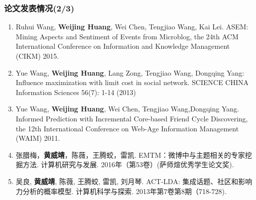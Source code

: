 \begin{transparentFootline}
\begin{frame}
\frametitle{\noindent 论文发表情况(2/3)}

\footnotesize
\begin{enumerate}\addtocounter{enumi}{5}
\item Ruhui Wang, \textbf{Weijing Huang}, Wei Chen, Tengjiao Wang, Kai Lei. ASEM: Mining Aspects and Sentiment of Events from Microblog, the 24th ACM International Conference on Information and Knowledge Management (CIKM) 2015.
\item Yue Wang, \textbf{Weijing Huang}, Lang Zong, Tengjiao Wang, Dongqing Yang: Influence maximization with limit cost in social network. SCIENCE CHINA Information Sciences 56(7): 1-14 (2013) 
\item Yue Wang, \textbf{Weijing Huang}, Wei Chen, Tengjiao Wang,Dongqing Yang. Informed Prediction with Incremental Core-based Friend Cycle Discovering, the 12th International Conference on Web-Age Information Management (WAIM) 2011. 
\item 张腊梅，\textbf{黄威靖}，陈薇，王腾蛟，雷凯. EMTM：微博中与主题相关的专家挖掘方法. 计算机研究与发展. 2016年（第53卷）(萨师煊优秀学生论文奖).
\item 吴良, \textbf{黄威靖}, 陈薇, 王腾蛟, 雷凯, 刘月琴. ACT-LDA: 集成话题、社区和影响力分析的概率模型. 计算机科学与探索. 2013年第7卷第8期（718-728). 
\end{enumerate}
\end{frame}
\end{transparentFootline}


